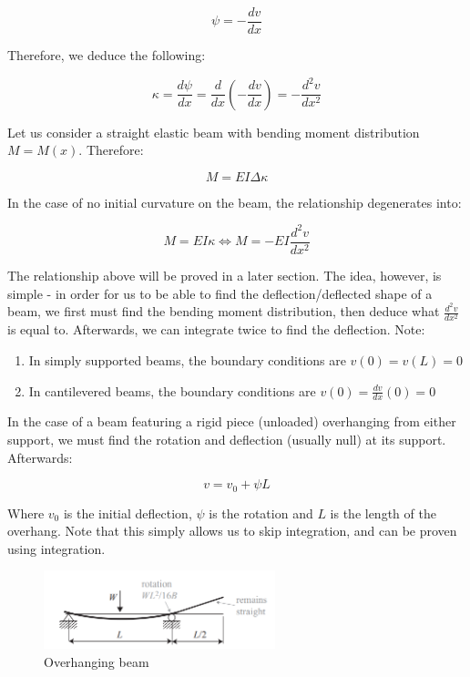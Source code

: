 \documentclass{article}
\begin{document}
\[ \psi = -\frac{dv}{dx} \]

Therefore, we deduce the following:

\[ \kappa = \frac{d\psi}{dx} = \frac{d}{dx}\left(-\frac{dv}{dx}\right) = - \frac{d^2v}{dx^2}\]

\begin{theorem}
    Let us consider a straight elastic beam with bending moment distribution $M = M(x)$. Therefore:

    \[ M = EI\Delta\kappa  \]

    In the case of no initial curvature on the beam, the relationship degenerates into:

    \[ M = EI\kappa \iff M = -EI\frac{d^2v}{dx^2} \]
\end{theorem}

The relationship above will be proved in a later section. The idea, however, is simple - in order for us to be able to find the deflection/deflected shape of a beam, we first must find the bending moment distribution, then deduce what $\frac{d^2v}{dx^2}$ is equal to. Afterwards, we can integrate twice to find the deflection. Note:

\begin{enumerate}
    \item In simply supported beams, the boundary conditions are $v(0) = v(L) = 0$
    \item In cantilevered beams, the boundary conditions are $v(0) = \frac{dv}{dx}(0) = 0$
\end{enumerate}

\begin{proposition}
    In the case of a beam featuring a rigid piece (unloaded) overhanging from either support, we must find the rotation and deflection (usually null) at its support. Afterwards:

    \[ v = v_0 + \psi L \]

    Where $v_0$ is the initial deflection, $\psi$ is the rotation and $L$ is the length of the overhang. Note that this simply allows us to skip integration, and can be proven using integration.
\end{proposition}

\begin{figure}[h]
    \centering
    \includegraphics[width = 0.6\textwidth]{images/overhang.png}
    \caption{Overhanging beam}
    \label{fig:enter-label}
\end{figure}
\end{document}
